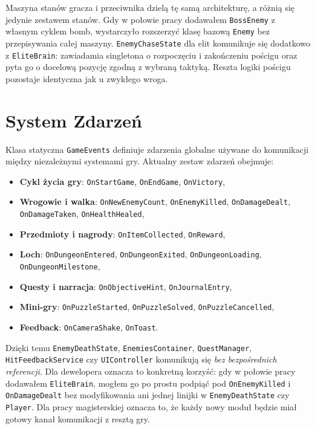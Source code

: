 Maszyna stanów gracza i przeciwnika dzielą tę samą architekturę, a różnią się jedynie zestawem stanów. Gdy w połowie pracy dodawałem \texttt{BossEnemy} z własnym cyklem bomb, wystarczyło rozszerzyć klasę bazową \texttt{Enemy} bez przepisywania całej maszyny. \texttt{EnemyChaseState} dla elit komunikuje się dodatkowo z \texttt{EliteBrain}: zawiadamia singletona o rozpoczęciu i zakończeniu pościgu oraz pyta go o docelową pozycję zgodną z wybraną taktyką. Reszta logiki pościgu pozostaje identyczna jak u zwykłego wroga.

\section{System Zdarzeń}

Klasa statyczna \texttt{GameEvents} definiuje zdarzenia globalne używane do komunikacji między niezależnymi systemami gry. Aktualny zestaw zdarzeń obejmuje:

\begin{itemize}
    \item \textbf{Cykl życia gry}: \texttt{OnStartGame}, \texttt{OnEndGame}, \texttt{OnVictory},
    \item \textbf{Wrogowie i walka}: \texttt{OnNewEnemyCount}, \texttt{OnEnemyKilled}, \texttt{OnDamageDealt}, \texttt{OnDamageTaken}, \texttt{OnHealthHealed},
    \item \textbf{Przedmioty i nagrody}: \texttt{OnItemCollected}, \texttt{OnReward},
    \item \textbf{Loch}: \texttt{OnDungeonEntered}, \texttt{OnDungeonExited}, \texttt{OnDungeonLoading}, \texttt{OnDungeonMilestone},
    \item \textbf{Questy i narracja}: \texttt{OnObjectiveHint}, \texttt{OnJournalEntry},
    \item \textbf{Mini-gry}: \texttt{OnPuzzleStarted}, \texttt{OnPuzzleSolved}, \texttt{OnPuzzleCancelled},
    \item \textbf{Feedback}: \texttt{OnCameraShake}, \texttt{OnToast}.
\end{itemize}

Dzięki temu \texttt{EnemyDeathState}, \texttt{EnemiesContainer}, \texttt{QuestManager}, \texttt{HitFeedbackService} czy \texttt{UIController} komunikują się \emph{bez bezpośrednich referencji}. Dla dewelopera oznacza to konkretną korzyść: gdy w połowie pracy dodawałem \texttt{EliteBrain}, mogłem go po prostu podpiąć pod \texttt{OnEnemyKilled} i \texttt{OnDamageDealt} bez modyfikowania ani jednej linijki w \texttt{EnemyDeathState} czy \texttt{Player}. Dla pracy magisterskiej oznacza to, że każdy nowy moduł będzie miał gotowy kanał komunikacji z resztą gry.

